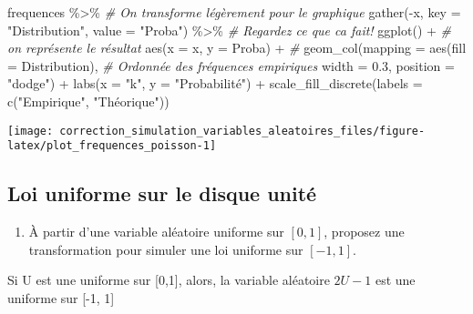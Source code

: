 \documentclass[
]{article}
\newenvironment{Shaded}{\begin{snugshade}}{\end{snugshade}}
\newcommand{\AttributeTok}[1]{\textcolor[rgb]{0.77,0.63,0.00}{#1}}
\newcommand{\CommentTok}[1]{\textcolor[rgb]{0.56,0.35,0.01}{\textit{#1}}}
\newcommand{\FloatTok}[1]{\textcolor[rgb]{0.00,0.00,0.81}{#1}}
\newcommand{\FunctionTok}[1]{\textcolor[rgb]{0.00,0.00,0.00}{#1}}
\newcommand{\NormalTok}[1]{#1}
\newcommand{\SpecialCharTok}[1]{\textcolor[rgb]{0.00,0.00,0.00}{#1}}
\newcommand{\StringTok}[1]{\textcolor[rgb]{0.31,0.60,0.02}{#1}}
\providecommand{\tightlist}{%
  \setlength{\itemsep}{0pt}\setlength{\parskip}{0pt}}
\newenvironment{Correction}%
  { \vspace{\baselineskip}\begin{mdframed}[backgroundcolor=my_green]}%
  {\end{mdframed}}
\begin{document}
\begin{Shaded}
\begin{Highlighting}[]
\NormalTok{frequences }\SpecialCharTok{\%\textgreater{}\%} \CommentTok{\# On transforme légèrement pour le graphique}
  \FunctionTok{gather}\NormalTok{(}\SpecialCharTok{{-}}\NormalTok{x, }\AttributeTok{key =} \StringTok{"Distribution"}\NormalTok{, }\AttributeTok{value =} \StringTok{"Proba"}\NormalTok{) }\SpecialCharTok{\%\textgreater{}\%} \CommentTok{\# Regardez ce que ca fait!}
  \FunctionTok{ggplot}\NormalTok{() }\SpecialCharTok{+} \CommentTok{\# on représente le résultat}
  \FunctionTok{aes}\NormalTok{(}\AttributeTok{x =}\NormalTok{ x, }\AttributeTok{y =}\NormalTok{ Proba) }\SpecialCharTok{+} \CommentTok{\# }
  \FunctionTok{geom\_col}\NormalTok{(}\AttributeTok{mapping =} \FunctionTok{aes}\NormalTok{(}\AttributeTok{fill =}\NormalTok{ Distribution), }\CommentTok{\# Ordonnée des fréquences empiriques}
           \AttributeTok{width =} \FloatTok{0.3}\NormalTok{, }\AttributeTok{position =} \StringTok{"dodge"}\NormalTok{) }\SpecialCharTok{+}
  \FunctionTok{labs}\NormalTok{(}\AttributeTok{x =} \StringTok{"k"}\NormalTok{, }\AttributeTok{y =} \StringTok{"Probabilité"}\NormalTok{) }\SpecialCharTok{+}
  \FunctionTok{scale\_fill\_discrete}\NormalTok{(}\AttributeTok{labels =} \FunctionTok{c}\NormalTok{(}\StringTok{"Empirique"}\NormalTok{, }\StringTok{"Théorique"}\NormalTok{))}
\end{Highlighting}
\end{Shaded}

\begin{center}\texttt{[image: correction\_simulation\_variables\_aleatoires\_files/figure-latex/plot\_frequences\_poisson-1]} \end{center}

\hypertarget{loi-uniforme-sur-le-disque-unituxe9}{%
\subsection{Loi uniforme sur le disque
unité}\label{loi-uniforme-sur-le-disque-unituxe9}}

\begin{enumerate}
\def\labelenumi{\arabic{enumi}.}
\tightlist
\item
  À partir d'une variable aléatoire uniforme sur \([0, 1]\), proposez
  une transformation pour simuler une loi uniforme sur \([-1, 1]\).
\end{enumerate}

\begin{Correction}
Si U est une uniforme sur [0,1], alors, la variable aléatoire $2U - 1$ est une uniforme
sur [-1, 1]
\end{Correction}
\end{document}
